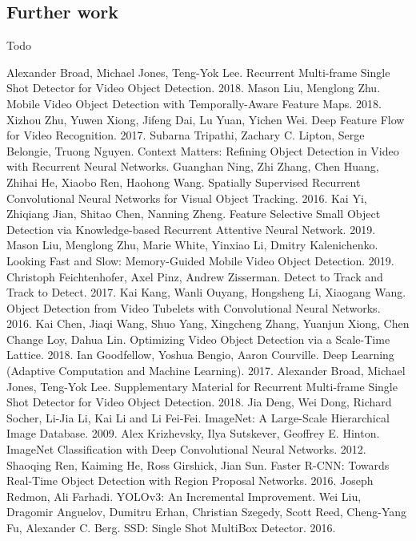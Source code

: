 \documentclass[conference]{IEEEtran}
\begin{document}
\subsection{Further work}
Todo

\begin{thebibliography}{00}
 Alexander Broad, Michael Jones, Teng-Yok Lee. Recurrent Multi-frame Single Shot Detector for Video Object Detection. 2018.
 Mason Liu, Menglong Zhu. Mobile Video Object Detection with Temporally-Aware Feature Maps. 2018.
 Xizhou Zhu, Yuwen Xiong, Jifeng Dai, Lu Yuan, Yichen Wei. Deep Feature Flow for Video Recognition. 2017.
 Subarna Tripathi, Zachary C. Lipton, Serge Belongie, Truong Nguyen. Context Matters: Refining Object Detection in Video with Recurrent Neural Networks.
 Guanghan Ning, Zhi Zhang, Chen Huang, Zhihai He, Xiaobo Ren, Haohong Wang. Spatially Supervised Recurrent Convolutional Neural Networks for Visual Object Tracking. 2016.
 Kai Yi, Zhiqiang Jian, Shitao Chen, Nanning Zheng. Feature Selective Small Object Detection via Knowledge-based Recurrent Attentive Neural Network. 2019.
 Mason Liu, Menglong Zhu, Marie White, Yinxiao Li, Dmitry Kalenichenko. Looking Fast and Slow: Memory-Guided Mobile Video Object Detection. 2019.
 Christoph Feichtenhofer, Axel Pinz, Andrew Zisserman. Detect to Track and Track to Detect. 2017.
 Kai Kang, Wanli Ouyang, Hongsheng Li, Xiaogang Wang. Object Detection from Video Tubelets with Convolutional Neural Networks. 2016.
 Kai Chen, Jiaqi Wang, Shuo Yang, Xingcheng Zhang, Yuanjun Xiong, Chen Change Loy, Dahua Lin. Optimizing Video Object Detection via a Scale-Time Lattice. 2018.
 Ian Goodfellow, Yoshua Bengio, Aaron Courville. Deep Learning (Adaptive Computation and Machine Learning). 2017.
 Alexander Broad, Michael Jones, Teng-Yok Lee. Supplementary Material for Recurrent Multi-frame Single Shot Detector for Video Object Detection. 2018.
 Jia Deng, Wei Dong, Richard Socher, Li-Jia Li, Kai Li and Li Fei-Fei. ImageNet: A Large-Scale Hierarchical Image Database. 2009.
 Alex Krizhevsky, Ilya Sutskever, Geoffrey E. Hinton. ImageNet Classification with Deep Convolutional Neural Networks. 2012.
 Shaoqing Ren, Kaiming He, Ross Girshick, Jian Sun. Faster R-CNN: Towards Real-Time Object Detection with Region Proposal Networks. 2016. 
 Joseph Redmon, Ali Farhadi. YOLOv3: An Incremental Improvement.
 Wei Liu, Dragomir Anguelov, Dumitru Erhan, Christian Szegedy, Scott Reed, Cheng-Yang Fu, Alexander C. Berg. SSD: Single Shot MultiBox Detector. 2016.

\end{thebibliography}
\end{document}
